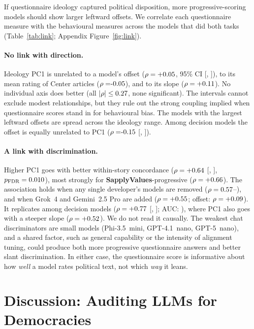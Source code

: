 \documentclass[11pt]{article}
\newcommand{\instSAP}[1]{\textcolor{cSAP}{\textbf{#1}}}
\newcommand{\sap}{\instSAP{SapplyValues}\xspace}
\begin{document}
If questionnaire ideology captured political disposition, more progressive-scoring models should show larger leftward offsets. We correlate each questionnaire measure with the behavioural measures across the \nNModelsLink{} models that did both tasks (Table~\ref{tab:link}; Appendix Figure~\ref{fig:link}).

\paragraph{No link with direction.}
Ideology PC1 is unrelated to a model's offset ($\rho=+0.05$, 95\% CI [\nRhoOffPCLo, \nRhoOffPCHi]), to its mean rating of Center articles ($\rho=\nRhoCenPC$), and to its slope ($\rho=+0.11$). No individual axis does better (all $|\rho|\le0.27$, none significant). The intervals cannot exclude modest relationships, but they rule out the strong coupling implied when questionnaire scores stand in for behavioural bias. The models with the largest leftward offsets are spread across the ideology range. Among decision models the offset is equally unrelated to PC1 ($\rho=\nDRhoOff$ [\nDRhoOffLo, \nDRhoOffHi]).

\paragraph{A link with discrimination.}
Higher PC1 goes with better within-story concordance ($\rho=+0.64$ [\nRhoConcPCLo, \nRhoConcPCHi], $p_{\text{FDR}}=0.010$), most strongly for \sap-progressive ($\rho=+0.66$). The association holds when any single developer's models are removed ($\rho=0.57$--\nLopoMax), and when Grok~4 and Gemini~2.5 Pro are added ($\rho=+0.55$; offset: $\rho=+0.09$). It replicates among decision models ($\rho=+0.77$ [\nDRhoConcLo, \nDRhoConcHi]; AUC: \nDRhoAUC), where PC1 also goes with a steeper slope ($\rho=+0.52$). We do not read it causally. The weakest chat discriminators are small models (Phi-3.5~mini, GPT-4.1~nano, GPT-5~nano), and a shared factor, such as general capability or the intensity of alignment tuning, could produce both more progressive questionnaire answers and better slant discrimination. In either case, the questionnaire score is informative about how \emph{well} a model rates political text, not which \emph{way} it leans.

\section{Discussion: Auditing LLMs for Democracies}
\end{document}
